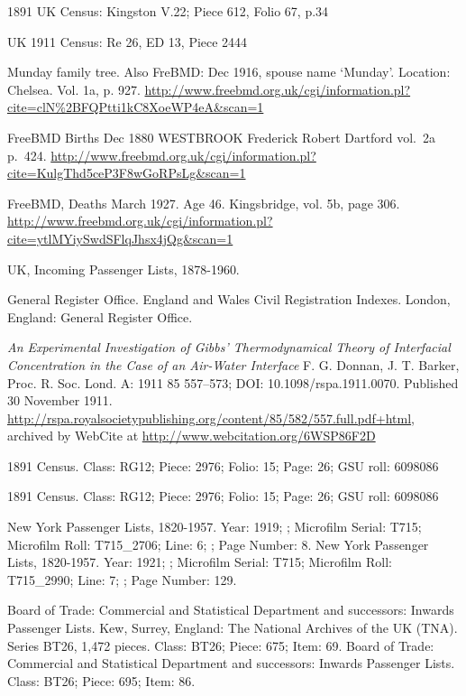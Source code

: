 \begin{thebibliography}{99}
	1891 UK Census: Kingston V.22; Piece 612, Folio 67, p.34 
	
	UK 1911 Census: Re 26, ED 13, Piece 2444
	
	Munday family tree.
	Also FreBMD: Dec 1916, spouse name `Munday'. Location: Chelsea. Vol. 1a, p. 927.
	\url{http://www.freebmd.org.uk/cgi/information.pl?cite=clN\%2BFQPtti1kC8XoeWP4eA&scan=1}

	FreeBMD Births Dec 1880
	WESTBROOK Frederick Robert Dartford vol.~2a p.~424.
	\url{http://www.freebmd.org.uk/cgi/information.pl?cite=KulgThd5ceP3F8wGoRPsLg&scan=1}

	 FreeBMD, Deaths March 1927. Age 46. Kingsbridge, vol. 5b, page 306.
	\url{http://www.freebmd.org.uk/cgi/information.pl?cite=ytlMYiySwdSFlqJhsx4jQg&scan=1}

	UK, Incoming Passenger Lists, 1878-1960. 
	
	General Register Office. England and Wales Civil Registration Indexes. London, England: General Register Office. 

	\emph{An Experimental Investigation of Gibbs' Thermodynamical Theory of Interfacial Concentration in the Case of an Air-Water Interface}
	F. G. Donnan, J. T. Barker,
	Proc. R. Soc. Lond. A: 1911 85 557--573; DOI: 10.1098/rspa.1911.0070. Published 30 November 1911.
	\url{http://rspa.royalsocietypublishing.org/content/85/582/557.full.pdf+html},
	archived by WebCite at \url{http://www.webcitation.org/6WSP86F2D}

	 1891 Census. Class: RG12; Piece: 2976; Folio: 15; Page: 26; GSU roll: 6098086
	 
	1891 Census. Class: RG12; Piece: 2976; Folio: 15; Page: 26; GSU roll: 6098086
	
	New York Passenger Lists, 1820-1957.
	Year: 1919; ; Microfilm Serial: T715; Microfilm Roll: T715\_2706; Line: 6; ; Page Number: 8.
	New York Passenger Lists, 1820-1957.
	Year: 1921; ; Microfilm Serial: T715; Microfilm Roll: T715\_2990; Line: 7; ; Page Number: 129.
	
	Board of Trade: Commercial and Statistical Department and successors: Inwards Passenger Lists. Kew, Surrey, England: The National Archives of the UK (TNA). Series BT26, 1,472 pieces.
	Class: BT26; Piece: 675; Item: 69.
	Board of Trade: Commercial and Statistical Department and successors: Inwards Passenger Lists.
	Class: BT26; Piece: 695; Item: 86.
	

\end{thebibliography}
